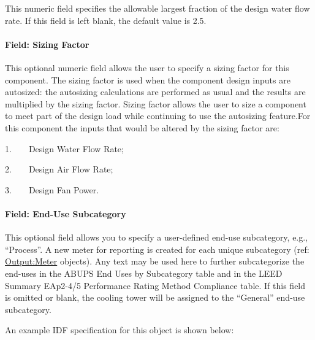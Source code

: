 This numeric field specifies the allowable largest fraction of the design water flow rate. If this field is left blank, the default value is 2.5.

\paragraph{Field: Sizing Factor}\label{field-sizing-factor-2}

This optional numeric field allows the user to specify a sizing factor for this component. The sizing factor is used when the component design inputs are autosized: the autosizing calculations are performed as usual and the results are multiplied by the sizing factor. Sizing factor allows the user to size a component to meet part of the design load while continuing to use the autosizing feature.For this component the inputs that would be altered by the sizing factor are:

1.~~~~Design Water Flow Rate;

2.~~~~Design Air Flow Rate;

3.~~~~Design Fan Power.

\paragraph{Field: End-Use Subcategory}\label{end-use-subcategory-05}

This optional field allows you to specify a user-defined end-use subcategory, e.g., ``Process''. A new meter for reporting is created for each unique subcategory (ref: \hyperref[outputmeter-and-outputmetermeterfileonly]{Output:Meter} objects). Any text may be used here to further subcategorize the end-uses in the ABUPS End Uses by Subcategory table and in the LEED Summary EAp2-4/5 Performance Rating Method Compliance table. If this field is omitted or blank, the cooling tower will be assigned to the ``General'' end-use subcategory.

An example IDF specification for this object is shown below:

